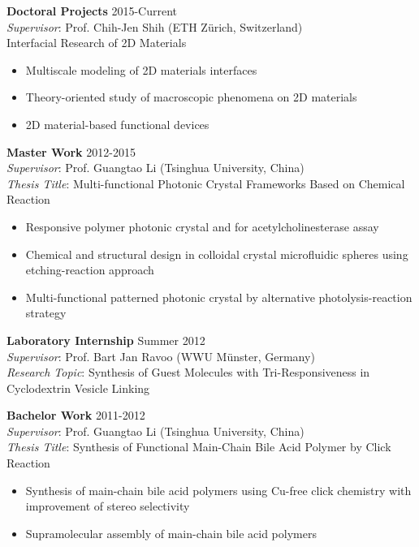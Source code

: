 \documentclass[margin]{res}
\begin{document}
\begin{resume}
\textbf{Doctoral Projects} \hfill 2015-Current\\
\textit{Supervisor}: Prof. Chih-Jen Shih (ETH Z\"{u}rich, Switzerland)\\
Interfacial Research of 2D Materials
\begin{itemize} \itemsep -2pt
  \item Multiscale modeling of 2D materials interfaces
  \item Theory-oriented study of macroscopic phenomena on 2D materials
  \item 2D material-based functional devices
  \end{itemize}
  
  

\textbf{Master Work} \hfill 2012-2015\\
\textit{Supervisor}: Prof. Guangtao Li (Tsinghua University, China)\\
 \textit{Thesis Title}: Multi-functional Photonic Crystal Frameworks Based on Chemical Reaction
 \begin{itemize} \itemsep -2pt  %
 \item Responsive polymer photonic crystal and for acetylcholinesterase assay
 \item Chemical and structural design in colloidal crystal microfluidic spheres using etching-reaction approach
 \item Multi-functional patterned photonic crystal by alternative photolysis-reaction strategy
 \end{itemize}

\textbf{Laboratory Internship} \hfill Summer 2012\\
 \textit{Supervisor}: Prof. Bart Jan Ravoo (WWU M\"{u}nster, Germany)\\
 \textit{Research Topic}: Synthesis of Guest Molecules with Tri-Responsiveness in Cyclodextrin Vesicle Linking


\textbf{Bachelor Work} \hfill 2011-2012\\
\textit{Supervisor}: Prof. Guangtao Li (Tsinghua University, China)\\
 \textit{Thesis Title}: Synthesis of Functional Main-Chain Bile Acid Polymer by Click Reaction
 \begin{itemize} \itemsep -2pt  %
 \item Synthesis of main-chain bile acid polymers using Cu-free click chemistry with improvement of stereo selectivity
 \item Supramolecular assembly of main-chain bile acid polymers
 \end{itemize}



\end{resume}
\end{document}
